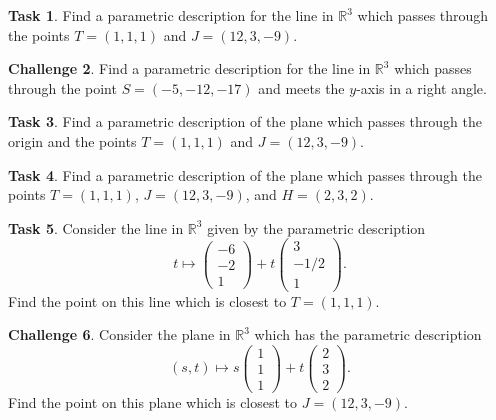 \documentclass{tufte-book}
\theoremstyle{definition}
\newtheorem{task}{Task}
\newtheorem{challenge}[task]{Challenge}
\begin{document}
\begin{task}
Find a parametric description for the line in $\mathbb{R}^3$ which passes through the points $T = (1,1,1)$ and $J=(12,3,-9)$.
\end{task}


\begin{challenge}
Find a parametric description for the line in $\mathbb{R}^3$ which passes through the point $S = (-5,-12,-17)$ and meets the $y$-axis in a right angle.
\end{challenge}





\begin{task}
Find a parametric description of the plane which passes through the origin and the points $T = (1,1,1)$ and $J = (12,3,-9)$.
\end{task}


\begin{task}
Find a parametric description of the plane which passes through the points $T = (1,1,1)$, $J = (12,3,-9)$, and $H = (2,3,2)$.
\end{task}


\begin{task}
Consider the line in $\mathbb{R}^3$ given by the parametric description
\[
t \mapsto \begin{pmatrix} -6\\-2\\1 \end{pmatrix} + t \begin{pmatrix} 3\\-1/2\\1\end{pmatrix}.
\]
Find the point on this line which is closest to $T = (1,1,1)$.
\end{task}


\begin{challenge}
Consider the plane in $\mathbb{R}^3$ which has the parametric description
\[
(s,t) \mapsto s\begin{pmatrix} 1\\1\\1\end{pmatrix} + t \begin{pmatrix} 2\\3\\2\end{pmatrix}. 
\]
Find the point on this plane which is closest to $J = (12,3,-9)$.
\end{challenge}
\end{document}
